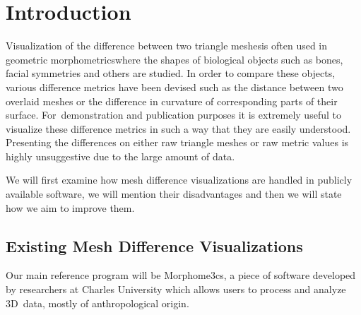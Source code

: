 \chapter*{Introduction}

Visualization of the difference between two triangle meshes\footnotemark is often used in geometric morphometrics\footnotemark where the shapes of biological objects such as bones, facial symmetries and others are studied. In order to compare these objects, various difference metrics have been devised such as the distance between two overlaid meshes or the difference in curvature of corresponding parts of their surface. For~demonstration and publication purposes it is extremely useful to visualize these difference metrics in such a way that they are easily understood. Presenting the differences on either raw triangle meshes or raw metric values is highly unsuggestive due to the large amount of data\footnotemark.

\addtocounter{footnote}{-3}

We will first examine how mesh difference visualizations are handled in publicly available software, we will mention their disadvantages and then we will state how we aim to improve them.

\section*{Existing Mesh Difference Visualizations}
\label{sec:existing_visualizations}

Our main reference program will be Morphome3cs\footnotemark, a piece of software developed by researchers at Charles University which allows users to process and analyze 3D~data, mostly of anthropological origin.


